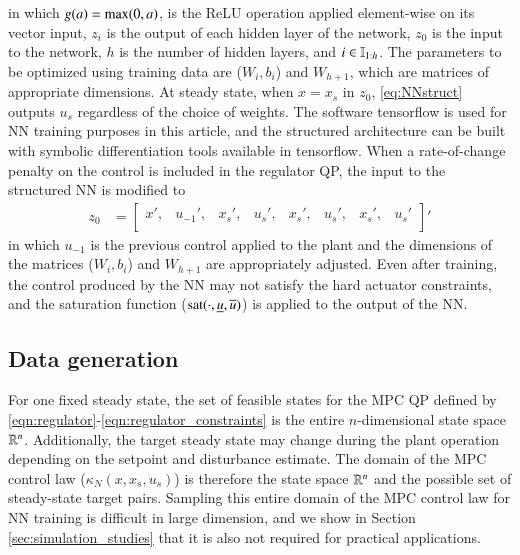 \documentclass[preprint,5p, twocolumn, authoryear]{elsarticle}
\begin{document}
in which $g(a) = \textnormal{max} (0, a)$,
is the ReLU operation applied element-wise on its vector input,
$z_i$ is the output of each hidden layer
of the network, $z_0$ is the input to the network, 
$h$ is the number of hidden layers, 
and $i \in \mathbb{I}_{1:h}$. 
The parameters to be optimized using 
training data are ($W_i, b_i$) 
and $W_{h+1}$, which are matrices 
of appropriate dimensions.
At steady state, when $x=x_s$ in $z_0$, \eqref{eq:NNstruct}
outputs $u_s$ regardless of the choice of weights.
The software tensorflow 
\citep{abadi:agarwal:barham:brevdo:et-al:2015} is used 
for NN training purposes in this article,
and the structured architecture can be built 
with symbolic differentiation tools available in tensorflow.
When a rate-of-change penalty on the control 
is included in the regulator QP, 
the input to the structured NN is modified to 
\begin{align*}
    z_0 &= 
    \begin{bmatrix}
    x', & u_{-1}', & x_s', & u_s', & x_s', & u_s', & x_s', & u_s' \\
    \end{bmatrix}'
\end{align*}
in which $u_{-1}$ is the previous control applied 
to the plant and the dimensions of the matrices 
($W_i, b_i$) and $W_{h+1}$ 
are appropriately adjusted. Even after 
training, the control produced by 
the NN may not satisfy the hard actuator constraints,
and the saturation function 
($\textnormal{sat}(\cdot, \underline{u}, \overline{u})$) 
is applied to the output of the NN.

\subsection{Data generation}

For one fixed steady state, the 
set of feasible states for the MPC QP 
defined by \eqref{eqn:regulator}-\eqref{eqn:regulator_constraints}
is the entire $n$-dimensional state space $\mathbb{R}^n$.
Additionally, the target steady state may change
during the plant operation depending
on the setpoint and disturbance estimate. 
The domain of the MPC control law ($\kappa_N(x, x_s, u_s)$)
is therefore the state space 
$\mathbb{R}^{n}$ and the possible set of steady-state 
target pairs. Sampling this entire domain of the
MPC control law for NN training is difficult in large 
dimension, and we show in Section 
\ref{sec:simulation_studies} that it is
also not required for practical applications. 
\end{document}
